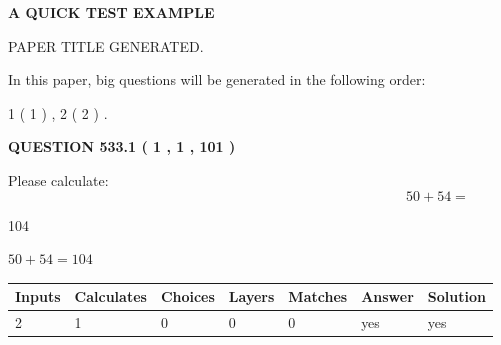 \documentclass[12pt]{article}
\begin{document}
   
 \vspace{0.2in}
{\LARGE {\textbf{ A QUICK TEST EXAMPLE}}}
   
   
 PAPER TITLE GENERATED.
   
   
   
\vspace{0.2in}
   
In this paper, big questions will be generated in the following order: 
   
   
   1 ( 1 )
 ,
   2 ( 2 )
 .
  
\vspace{0.2in}
  
{\textbf{\Large{QUESTION
533.1 
 ( 1 , 1 , 101 )
}}}
  
  
 
Please calculate:
\begin{equation}
50 +  %
54 = \nonumber
\end{equation}
 
 
 
\noindent{}
 
 

104
 
 
\noindent{}
 
 

 
 
 
\noindent{}
 
 

$ %
50 +  %
54=   %
104$
 
 
\noindent{}
 
 

 
   
   
   
   
\noindent\begin{tabular}{|l|l|l|l|l|l|l|}
 \hline
Inputs & Calculates & Choices & Layers & Matches & Answer & Solution \\ \hline
 2  & 
 1  & 
 0
  & 
 0  & 
 0  & 
  yes & 
  yes 
  \\ \hline
 \end{tabular}
   
   
   
   
\noindent{}
   
\end{document}
